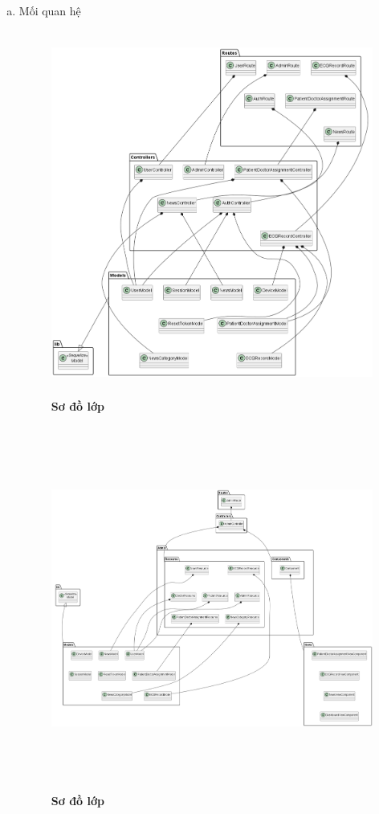 \begin{enumerate}[a)]
\item Mối quan hệ

\begin{figure}[H]
  \centering
  \includegraphics[width=15cm,height=12cm]{Images/server/class/class_relation.png}
  \caption[Sơ đồ lớp]{\bfseries \fontsize{12pt}{0pt}\selectfont Sơ đồ lớp}
  \label{hinh2} %
\end{figure}


\begin{figure}[H]
  \centering
  \includegraphics[width=15cm,height=12cm]{Images/server/class/class_admin_relation.png}
  \caption[Sơ đồ lớp]{\bfseries \fontsize{12pt}{0pt}\selectfont Sơ đồ lớp}
  \label{hinh2} %
\end{figure}

\end{enumerate}


